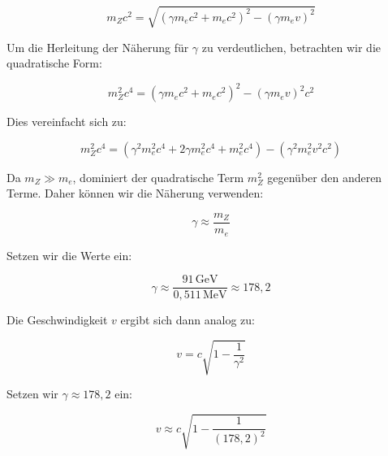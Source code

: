 \[
m_Z c^2 = \sqrt{(\gamma m_e c^2 + m_e c^2)^2 - (\gamma m_e v)^2}
\]

Um die Herleitung der Näherung für \( \gamma \) zu verdeutlichen, betrachten wir die quadratische Form:

\[
m_Z^2 c^4 = (\gamma m_e c^2 + m_e c^2)^2 - (\gamma m_e v)^2 c^2
\]

Dies vereinfacht sich zu:

\[
m_Z^2 c^4 = (\gamma^2 m_e^2 c^4 + 2 \gamma m_e^2 c^4 + m_e^2 c^4) - (\gamma^2 m_e^2 v^2 c^2)
\]

Da \( m_Z \gg m_e \), dominiert der quadratische Term \( m_Z^2 \) gegenüber den anderen Terme. Daher können wir die Näherung verwenden:

\[
\gamma \approx \frac{m_Z}{m_e}
\]

Setzen wir die Werte ein:

\[
\gamma \approx \frac{91 \, \text{GeV}}{0{,}511 \, \text{MeV}} \approx 178{,}2
\]

Die Geschwindigkeit \( v \) ergibt sich dann analog zu:

\[
v = c \sqrt{1 - \frac{1}{\gamma^2}}
\]

Setzen wir \( \gamma \approx 178{,}2 \) ein:

\[
v \approx c \sqrt{1 - \frac{1}{(178{,}2)^2}}
\]

